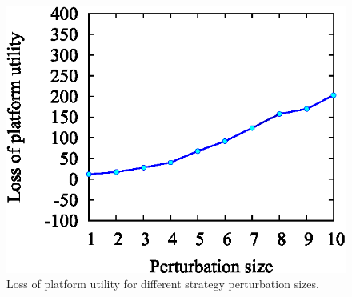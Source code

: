 \documentclass[conference]{IEEEtran}
\theoremstyle{definition}
\begin{document}
\begin{figure}[!t]
\begin{minipage}{0.3\textwidth}
\label{fig:up_ratio_dis}
\end{minipage}
\hspace{0.01cm}
\begin{minipage}{0.3\textwidth}
\includegraphics[width=\textwidth]{collusion_resist_codes/images/img_up_perturb_dis.eps}
\caption{Loss of platform utility for different strategy perturbation sizes.}
\label{fig:up_perturb_dis}
\end{minipage}
\end{figure}

\end{document}

